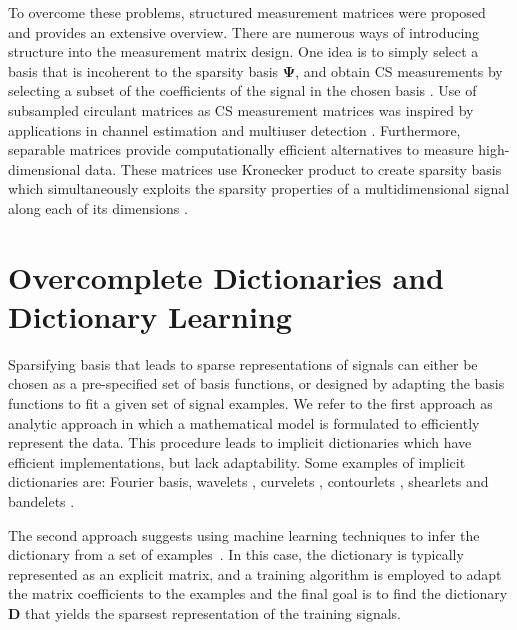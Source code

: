 \documentclass[journal]{IEEEtran}
\begin{document}
To overcome these problems, structured measurement matrices were proposed and \cite{Li2015} provides an extensive overview. There are numerous ways of introducing structure into the measurement matrix design. One idea is to simply select a basis that is incoherent to the sparsity basis $\boldsymbol{\Psi}$, and obtain CS measurements by selecting a subset of the coefficients of the signal in the chosen basis \cite{Candes2007}. Use of subsampled circulant matrices as CS measurement matrices was inspired by applications in channel estimation and multiuser detection \cite{bajwa2007toeplitz, haupt2010toeplitz, yinpractical}. Furthermore, separable matrices provide computationally efficient alternatives to measure high-dimensional data. These matrices use Kronecker product \cite{schacke2013kronecker} to create sparsity basis which simultaneously exploits the sparsity properties of a multidimensional signal along each of its dimensions \cite{Rivenson2009, Duarte2012}.  

\section{Overcomplete Dictionaries and Dictionary Learning} \label{sec:4}

Sparsifying basis that leads to sparse representations of signals can either be chosen as a pre-specified set of basis functions, or designed by adapting the basis functions to fit a given set of signal examples. We refer to the first approach as analytic approach in which a mathematical model is formulated to efficiently represent the data. This procedure leads to implicit dictionaries which have efficient implementations, but lack adaptability. Some examples of implicit dictionaries are: Fourier basis, wavelets \cite{daubechies1992ten}, curvelets \cite{starck2002curvelet}, contourlets \cite{do2002contourlets}, shearlets \cite{guo2007optimally} and bandelets \cite{le2005sparse}. 

The second approach suggests using machine learning techniques to infer the dictionary from a set of examples~\cite{olshausen1996emergence, Petrov2012, Rubinstein, Christen2010}. In this case, the dictionary is typically represented as an explicit matrix, and a training algorithm is employed to adapt the matrix coefficients to the examples and the final goal is to find the dictionary $\boldsymbol{D}$ that yields the sparsest representation of the training signals. 
\end{document}
